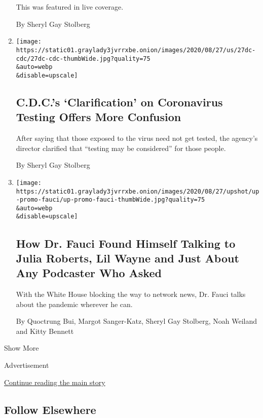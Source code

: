 \begin{enumerate}
  This was featured in live coverage.

  By Sheryl Gay Stolberg
\item
  \href{/2020/08/27/us/politics/trump-coronavirus-testing.html}{}

  \texttt{[image: https://static01.graylady3jvrrxbe.onion/images/2020/08/27/us/27dc-cdc/27dc-cdc-thumbWide.jpg?quality=75\\\&auto=webp\\\&disable=upscale]}

  \hypertarget{cdcs-clarification-on-coronavirus-testing-offers-more-confusion}{%
  \subsection{C.D.C.'s `Clarification' on Coronavirus Testing Offers
  More
  Confusion}\label{cdcs-clarification-on-coronavirus-testing-offers-more-confusion}}

  After saying that those exposed to the virus need not get tested, the
  agency's director clarified that ``testing may be considered'' for
  those people.

  By Sheryl Gay Stolberg
\item
  \href{/interactive/2020/08/27/upshot/fauci-media-appearances.html}{}

  \texttt{[image: https://static01.graylady3jvrrxbe.onion/images/2020/08/27/upshot/up-promo-fauci/up-promo-fauci-thumbWide.jpg?quality=75\\\&auto=webp\\\&disable=upscale]}

  \hypertarget{how-dr-fauci-found-himself-talking-to-julia-roberts-lil-wayne-and-just-about-any-podcaster-who-asked}{%
  \subsection{How Dr. Fauci Found Himself Talking to Julia Roberts, Lil
  Wayne and Just About Any Podcaster Who
  Asked}\label{how-dr-fauci-found-himself-talking-to-julia-roberts-lil-wayne-and-just-about-any-podcaster-who-asked}}

  With the White House blocking the way to network news, Dr. Fauci talks
  about the pandemic wherever he can.

  By Quoctrung Bui, Margot Sanger-Katz, Sheryl Gay Stolberg, Noah
  Weiland and Kitty Bennett
\end{enumerate}

Show More

Advertisement

\protect\hyperlink{after-mid2}{Continue reading the main story}

\hypertarget{follow-elsewhere}{%
\subsection{Follow Elsewhere}\label{follow-elsewhere}}

